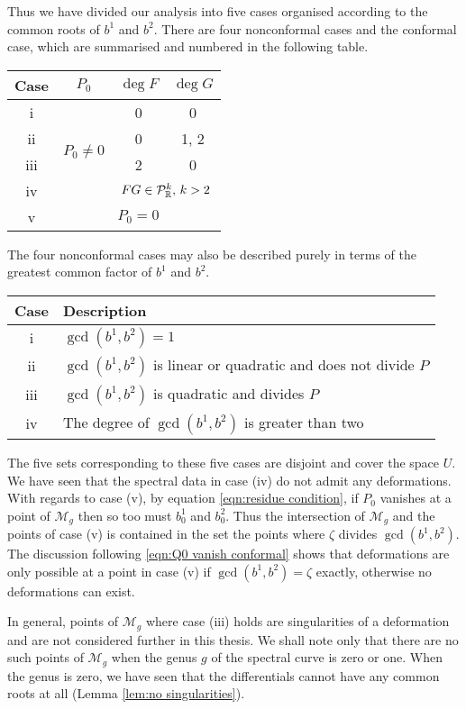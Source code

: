 Thus we have divided our analysis into five cases organised according to the common roots of $b^1$ and $b^2$. There are four nonconformal cases and the conformal case, which are summarised and numbered in the following table.
\begin{center}
\begin{tabular}{|c|c|c|c|}
\hline
Case & $P_0$ & $\deg F$ & $\deg G$ \\ \hline\hline
i & \multirow{4}{*}{$P_0 \neq 0$} & 0 & 0 \\ \cline{1-1}\cline{3-4}
ii && 0 & 1, 2 \\ \cline{1-1}\cline{3-4}
iii && 2 & 0 \\ \cline{1-1}\cline{3-4}
iv && \multicolumn{2}{|c|}{$FG \in \mathcal{P}^k_\R,\, k>2$} \\ \hline
v & \multicolumn{3}{|c|}{$P_0 = 0$} \\ \hline
\end{tabular}
\end{center}
The four nonconformal cases may also be described purely in terms of the greatest common factor of $b^1$ and $b^2$.
\begin{center}
\begin{tabular}{|c|l|}
\hline
Case & Description\\ \hline\hline
i & $\gcd(b^1,b^2) = 1$\\ \hline
ii & $\gcd(b^1,b^2)$ is linear or quadratic and does not divide $P$ \\ \hline
iii & $\gcd(b^1,b^2)$ is quadratic and divides $P$ \\ \hline
iv & The degree of $\gcd(b^1,b^2)$ is greater than two \\ \hline
\end{tabular}
\end{center}

The five sets corresponding to these five cases are disjoint and cover the space $U$. We have seen that the spectral data in case (iv) do not admit any deformations.
With regards to case (v), by equation \eqref{eqn:residue condition}, if $P_0$ vanishes at a point of $\mathcal{M}_g$ then so too must $b^1_0$ and $b^2_0$. Thus the intersection of $\mathcal{M}_g$ and the points of case (v) is contained in the set the points where $ζ$ divides $\gcd(b^1,b^2)$. The discussion following \eqref{eqn:Q0 vanish conformal} shows that deformations are only possible at a point in case (v) if $\gcd(b^1,b^2) = ζ$ exactly, otherwise no deformations can exist.

In general, points of $\mathcal{M}_g$ where case (iii) holds are singularities of a deformation \cite{Schmidt2016} and are not considered further in this thesis. We shall note only that there are no such points of $\mathcal{M}_g$ when the genus $g$ of the spectral curve is zero or one.
When the genus is zero, we have seen that the differentials cannot have any common roots at all (Lemma \ref{lem:no singularities}).

